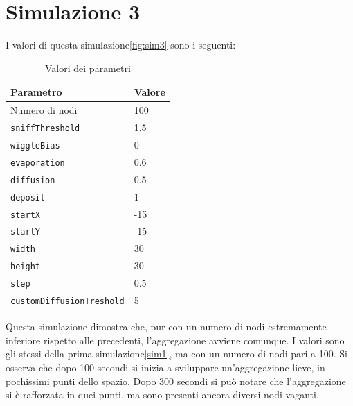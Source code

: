 \section{Simulazione 3}\label{sim3}
I valori di questa simulazione\space \cref{fig:sim3} sono i seguenti:
\begin{table}[ht]
    \centering
    \caption{Valori dei parametri}
    \begin{tabular}{ll}
        \toprule
        Parametro                   & Valore \\
        \midrule
        Numero di nodi              & 100    \\
        \texttt{sniffThreshold}     & 1.5    \\
        \texttt{wiggleBias}         & 0      \\
        \texttt{evaporation}        & 0.6    \\
        \texttt{diffusion}          & 0.5    \\
        \texttt{deposit}            & 1      \\
        \texttt{startX}             & -15    \\
        \texttt{startY}             & -15    \\
        \texttt{width}              & 30     \\
        \texttt{height}             & 30     \\
        \texttt{step}               & 0.5    \\
        \texttt{customDiffusionTreshold} & 5 \\
        \bottomrule
    \end{tabular}\label{tab:parametri3}
\end{table}\newline
Questa simulazione dimostra che, pur con un numero di nodi estremamente inferiore rispetto alle precedenti,
l'aggregazione avviene comunque. I valori sono gli stessi della prima simulazione\space\cref{sim1}, ma con un numero di nodi pari a 100.
Si osserva che dopo 100 secondi si inizia a sviluppare un'aggregazione lieve, in pochissimi punti dello spazio.
Dopo 300 secondi si può notare che l'aggregazione si è rafforzata in quei punti, ma sono presenti ancora diversi nodi vaganti.


